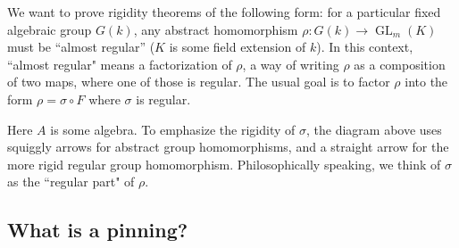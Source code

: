 \documentclass[12pt]{article}
\theoremstyle{definition}
\newcommand{\sig}{\sigma}
\DeclareMathOperator{\GL}{GL}
\begin{document}
We want to prove rigidity theorems of the following form: for a particular fixed algebraic group $G(k)$, any abstract homomorphism $\rho:G(k) \to \GL_m(K)$ must be ``almost regular'' ($K$ is some field extension of $k$). In this context, ``almost regular" means a factorization of $\rho$, a way of writing $\rho$ as a composition of two maps, where one of those is regular. The usual goal is to factor $\rho$ into the form $\rho = \sig \circ F$ where $\sig$ is regular.
\begin{center}
\end{center}
Here $A$ is some algebra. To emphasize the rigidity of $\sig$, the diagram above uses squiggly arrows for abstract group homomorphisms, and a straight arrow for the more rigid regular group homomorphism. Philosophically speaking, we think of $\sig$ as the ``regular part" of $\rho$.

\subsection{What is a pinning?}
\end{document}
